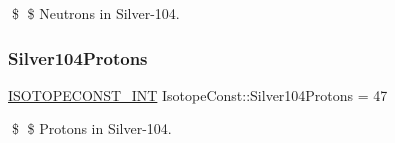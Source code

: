 \$ \$ Neutrons in Silver-\/104. \mbox{\label{group___isotope_const-_silver-_ag104_ga644f8aa356ce8d85a84233c79a194a03}} 
\subsubsection{\texorpdfstring{Silver104\+Protons}{Silver104Protons}}
{\footnotesize\ttfamily \mbox{\hyperlink{group___isotope_const-_macros_ga5f18360b3e99483a35c32d789e62621c}{I\+S\+O\+T\+O\+P\+E\+C\+O\+N\+S\+T\+\_\+\+I\+NT}} Isotope\+Const\+::\+Silver104\+Protons = 47}

\$ \$ Protons in Silver-\/104. 